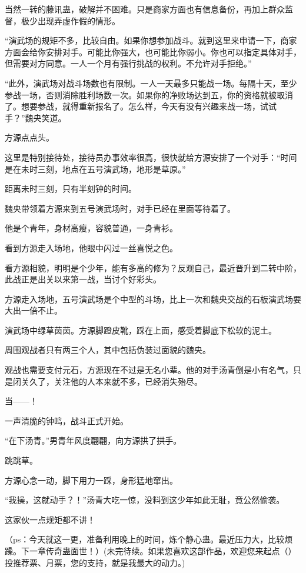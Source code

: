 \begin{this_body}
当然一转的藤讯蛊，破解并不困难。只是商家方面也有信息备份，再加上群众监督，极少出现弄虚作假的情形。

“演武场的规矩不多，比较自由。如果你想参加战斗。就到这里来申请一下，商家方面会给你安排对手。可能比你强大，也可能比你弱小。你也可以指定具体对手，但需要对方同意。一人一个月有强行挑战的权利。不允许对手拒绝。”

“此外，演武场对战斗场数也有限制。一人一天最多只能战一场。每隔十天，至少参战一场，否则消除胜利场数一次。如果你的净败场达到五，你的资格就被取消了。想要参战，就得重新报名了。怎么样，今天有没有兴趣来战一场，试试手？”魏央笑道。

方源点点头。

这里是特别接待处，接待员办事效率很高，很快就给方源安排了一个对手：“时间是在未时三刻，地点在五号演武场，地形是草原。”

距离未时三刻，只有半刻钟的时间。

魏央带领着方源来到五号演武场时，对手已经在里面等待着了。

他是个青年，身材高瘦，容貌普通，一身青衫。

看到方源走入场地，他眼中闪过一丝喜悦之色。

看方源相貌，明明是个少年，能有多高的修为？反观自己，最近晋升到二转中阶，此战正是出关以来第一战，当讨个好彩头。

方源走入场地，五号演武场是个中型的斗场，比上一次和魏央交战的石板演武场要大出一倍不止。

演武场中绿草茵茵。方源脚蹬皮靴，踩在上面，感受着脚底下松软的泥土。

周围观战者只有两三个人，其中包括伪装过面貌的魏央。

观战也需要支付元石，方源现在不过是无名小辈。他的对手汤青倒是小有名气，只是闭关久了，关注他的人本来就不多，已经消失殆尽。

当——！

一声清脆的钟鸣，战斗正式开始。

“在下汤青。”男青年风度翩翩，向方源拱了拱手。

跳跳草。

方源心念一动，脚下用力一踩，身形猛地窜出。

“我操，这就动手？！”汤青大吃一惊，没料到这少年如此无耻，竟公然偷袭。

这家伙一点规矩都不讲！

（ps：今天就这一更，准备利用晚上的时间，炼个静心蛊。最近压力大，比较烦躁。下一章传奇蛊面世！）(未完待续。如果您喜欢这部作品，欢迎您来起点（）投推荐票、月票，您的支持，就是我最大的动力。)

\end{this_body}

